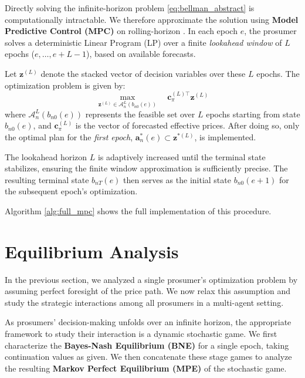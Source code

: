 \documentclass[12pt, notitlepage]{article}
\begin{document}
\noindent{}Directly solving the infinite-horizon problem \eqref{eq:bellman_abstract} is computationally intractable. We therefore approximate the solution using \textbf{Model Predictive Control (MPC)} on rolling-horizon \citep{prat2024finitehorizon}. In each epoch $e$, the prosumer solves a deterministic Linear Program (LP) over a finite \textit{lookahead window} of $L$ epochs ($e, \dots, e+L-1$), based on available forecasts. 

Let $\mathbf{z}^{(L)}$ denote the stacked vector of decision variables over these $L$ epochs. The optimization problem is given by:
\begin{equation} \label{eq:mpc_lp_concise}
\max_{\mathbf{z}^{(L)} \in \mathcal{A}_n^L(b_{n0}(e))} \quad \mathbf{c}_{\pi}^{(L)\top} \mathbf{z}^{(L)}
\end{equation}
where $\mathcal{A}_n^L(b_{n0}(e))$ represents the feasible set over $L$ epochs starting from state $b_{n0}(e)$, and $\mathbf{c}_{\pi}^{(L)}$ is the vector of forecasted effective prices. After doing so, only the optimal plan for the \textit{first epoch}, $\boldsymbol{a}_n^*(e) \subset \mathbf{z}^{*(L)}$, is implemented. 

The lookahead horizon $L$ is adaptively increased until the terminal state stabilizes, ensuring the finite window approximation is sufficiently precise. The resulting terminal state $b_{nT}(e)$ then serves as the initial state $b_{n0}(e+1)$ for the subsequent epoch's optimization. 

Algorithm \ref{alg:full_mpc} shows the full implementation of this procedure.  

\section{Equilibrium Analysis}
\label{sec:equilibrium}


In the previous section, we analyzed a single prosumer's optimization problem by assuming perfect foresight of the price path. We now relax this assumption and study the strategic interactions among all prosumers in a multi-agent setting. 

As prosumers' decision-making unfolds over an infinite horizon, the appropriate framework to study their interaction is a dynamic stochastic game. We first characterize the \textbf{Bayes-Nash Equilibrium (BNE)} for a single epoch, taking continuation values as given. We then concatenate these stage games to analyze the resulting \textbf{Markov Perfect Equilibrium (MPE)} of the stochastic game.
\end{document}
